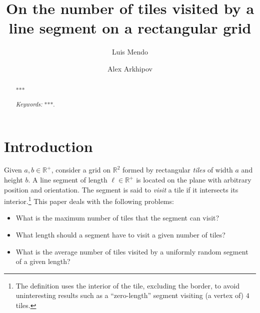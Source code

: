 \documentclass[12pt, a4paper]{article}
\newcommand{\len}{\ell} %
\newcommand{\touch}{visit}
\newcommand{\touched}{visited}
\newcommand{\touching}{visiting}
\begin{document}
\title{
On the number of tiles \touched{} by a\\
line segment on a rectangular grid
}

\author[1]{Luis Mendo}
\author[2]{Alex Arkhipov}




\maketitle

\begin{abstract}
***

\emph{Keywords:} ***.

\end{abstract}


\section{Introduction}
\label{part: intro}

Given $a, b \in \mathbb R^+$, consider a grid on $\mathbb R^2$ formed by rectangular \emph{tiles} of width $a$ and height $b$. A line segment of length $\len \in \mathbb R^+$ is located on the plane with arbitrary position and orientation. The segment is said to \emph{\touch} a tile if it intersects its interior.\footnote{
The definition uses the interior of the tile, excluding the border, to avoid uninteresting results such as a ``zero-length'' segment \touching{} (a vertex of) $4$ tiles.} This paper deals with the following problems:
\begin{itemize}
\item What is the maximum number of tiles that the segment can \touch?
\item What length should a segment have to \touch{} a given number of tiles?
\item What is the average number of tiles \touched{} by a uniformly random segment of a given length?
\end{itemize}
\end{document}
